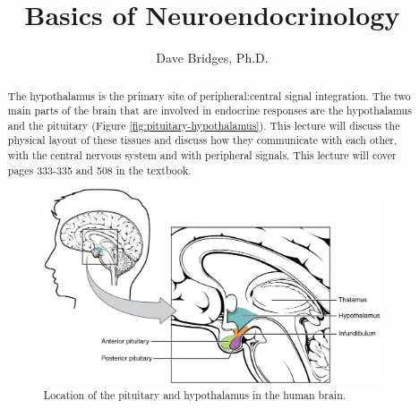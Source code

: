 \documentclass{tufte-handout}
\title{Basics of Neuroendocrinology}
\author{Dave Bridges, Ph.D.}
\begin{document}
\maketitle%

\begin{abstract}
\noindent The hypothalamus is the primary site of peripheral:central signal integration.  The two main parts of the brain that are involved in endocrine responses are the hypothalamus and the pituitary (Figure \ref{fig:pituitary-hypothalamus}).  This lecture will discuss the physical layout of these tissues and discuss how they communicate with each other, with the central nervous system and with peripheral signals.  This lecture will cover pages 333-335 and 508 in the textbook\cite{Widmaier2013}.

\begin{figure}[h]
  \includegraphics{figures/pituitary-hypothalamus}
  \caption{Location of the pituitary and hypothalamus in the human brain.}
    \label{fig:pituitary-hypothalamus}
\end{figure}
\end{abstract}

\tableofcontents

\pagebreak
\end{document}
